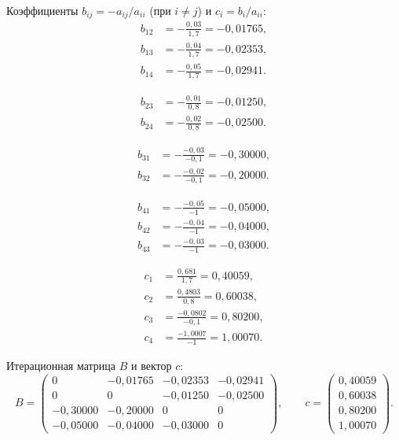 \documentclass[a4paper, final]{article}
\begin{document}
Коэффициенты $b_{ij} = -a_{ij}/a_{ii}$ (при $i \ne j$) и $c_i = b_i/a_{ii}$:
\begin{align*}
b_{12} &= -\tfrac{0{,}03}{1{,}7}    = -0{,}01765, \\
b_{13} &= -\tfrac{0{,}04}{1{,}7}    = -0{,}02353, \\
b_{14} &= -\tfrac{0{,}05}{1{,}7}    = -0{,}02941.
\end{align*}

\begin{align*}
b_{23} &= -\tfrac{0{,}01}{0{,}8}    = -0{,}01250, \\
b_{24} &= -\tfrac{0{,}02}{0{,}8}    = -0{,}02500.
\end{align*}

\begin{align*}
b_{31} &= -\tfrac{-0{,}03}{-0{,}1}  = -0{,}30000, \\
b_{32} &= -\tfrac{-0{,}02}{-0{,}1}  = -0{,}20000.
\end{align*}

\begin{align*}
b_{41} &= -\tfrac{-0{,}05}{-1}      = -0{,}05000, \\
b_{42} &= -\tfrac{-0{,}04}{-1}      = -0{,}04000, \\
b_{43} &= -\tfrac{-0{,}03}{-1}      = -0{,}03000.
\end{align*}

\begin{align*}
	c_1    &= \tfrac{0{,}681}{1{,}7}     =  0{,}40059, \\
c_2    &= \tfrac{0{,}4803}{0{,}8}    =  0{,}60038, \\
c_3    &= \tfrac{-0{,}0802}{-0{,}1} =  0{,}80200, \\
c_4    &= \tfrac{-1{,}0007}{-1}     =  1{,}00070.
\end{align*}

Итерационная матрица $B$ и вектор $c$:
\[
B = \begin{pmatrix}
0          & -0{,}01765 & -0{,}02353 & -0{,}02941 \\
0          & 0          & -0{,}01250 & -0{,}02500 \\
-0{,}30000 & -0{,}20000 & 0          & 0          \\
-0{,}05000 & -0{,}04000 & -0{,}03000 & 0
\end{pmatrix},\qquad
c = \begin{pmatrix}0{,}40059\\0{,}60038\\0{,}80200\\1{,}00070\end{pmatrix}.
\]
\end{document}
